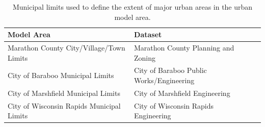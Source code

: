 \begin{table}
\begin{center}
	\caption[Municipal limits used to define the extent of major urban areas]{Municipal limits used to define the extent of major urban areas in the urban model area.}
	\begin{tabular}{l lc}
	\hline
		Model Area	      &	Dataset \\
	\hline	\hline
		Marathon County City/Village/Town Limits        &	Marathon County Planning and Zoning \\
		City of Baraboo Municipal Limits  &	City of Baraboo Public Works/Engineering	 	\\
		City of Marshfield Municipal Limits &	City of Marshfield Engineering \\
		City of Wisconsin Rapids Municipal Limits & City of Wisconsin Rapids Engineering\\
		\hline
	\end{tabular}
\label{tab:specific_urban_areas_limits}
\end{center}
\end{table}
